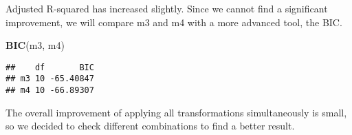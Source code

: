 \documentclass[
]{article}
\newenvironment{Shaded}{\begin{snugshade}}{\end{snugshade}}
\newcommand{\FunctionTok}[1]{\textcolor[rgb]{0.13,0.29,0.53}{\textbf{#1}}}
\newcommand{\NormalTok}[1]{#1}
\begin{document}
Adjusted R-squared has increased slightly. Since we cannot find a
significant improvement, we will compare m3 and m4 with a more advanced
tool, the BIC.

\begin{Shaded}
\begin{Highlighting}[]
\FunctionTok{BIC}\NormalTok{(m3, m4)}
\end{Highlighting}
\end{Shaded}

\begin{verbatim}
##    df       BIC
## m3 10 -65.40847
## m4 10 -66.89307
\end{verbatim}

The overall improvement of applying all transformations simultaneously
is small, so we decided to check different combinations to find a better
result.
\end{document}
